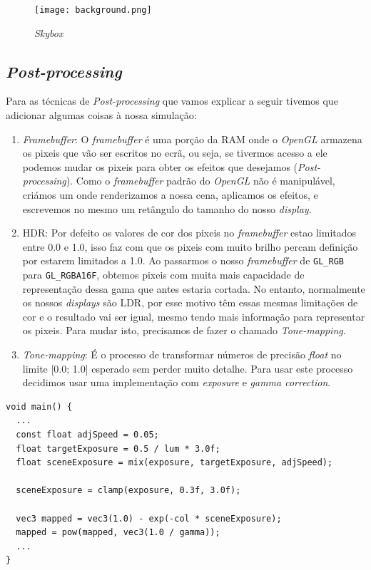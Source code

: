 \enlargethispage{1in}

\begin{figure}[H]
    \centering
    \texttt{[image: background.png]}
    \caption{\textit{Skybox}}
\end{figure}

\subsection{\textit{Post-processing}}

Para as técnicas de \textit{Post-processing} que vamos explicar a seguir tivemos que adicionar algumas coisas à nossa simulação:
\begin{enumerate}
    \item \textit{Framebuffer}: O \textit{framebuffer} é uma porção da \ac{RAM} onde o \textit{OpenGL} armazena os pixeis que vão ser escritos no ecrã, ou seja, se tivermos acesso a ele podemos mudar os pixeis para obter os efeitos que desejamos (\textit{Post-processing}). Como o \textit{framebuffer} padrão do \textit{OpenGL} não é manipulável, criámos um onde renderizamos a nossa cena, aplicamos os efeitos, e escrevemos no mesmo um retângulo do tamanho do nosso \textit{display}.
    
    \item  \ac{HDR}: Por defeito os valores de cor dos pixeis no \textit{framebuffer} estao limitados entre 0.0 e 1.0, isso faz com que os pixeis com muito brilho percam definição por estarem limitados a 1.0. Ao passarmos o nosso \textit{framebuffer} de \texttt{GL\_RGB} para \texttt{GL\_RGBA16F}, obtemos pixeis com muita mais capacidade de representação dessa gama que antes estaria cortada. 
    No entanto, normalmente os nossos \textit{displays} são \ac{LDR}, por esse motivo têm essas mesmas limitações de cor e o resultado vai ser igual, mesmo tendo mais informação para representar os pixeis. Para mudar isto, precisamos de fazer o chamado \textit{Tone-mapping}.

    \item \textit{Tone-mapping}: É o processo de transformar números de precisão \textit{float} no limite [0.0; 1.0] esperado sem perder muito detalhe. Para usar este processo decidimos usar uma implementação com \textit{exposure} e \textit{gamma correction}.
\end{enumerate}

\newpage
\begin{lstlisting}[style=Cpp, caption=\textit{Fragment Shader} do \textit{framebuffer} para a \textit{exposure}]
void main() {
  ...
  const float adjSpeed = 0.05;
  float targetExposure = 0.5 / lum * 3.0f; 
  float sceneExposure = mix(exposure, targetExposure, adjSpeed);

  sceneExposure = clamp(exposure, 0.3f, 3.0f);

  vec3 mapped = vec3(1.0) - exp(-col * sceneExposure);
  mapped = pow(mapped, vec3(1.0 / gamma));
  ...
}
\end{lstlisting}

